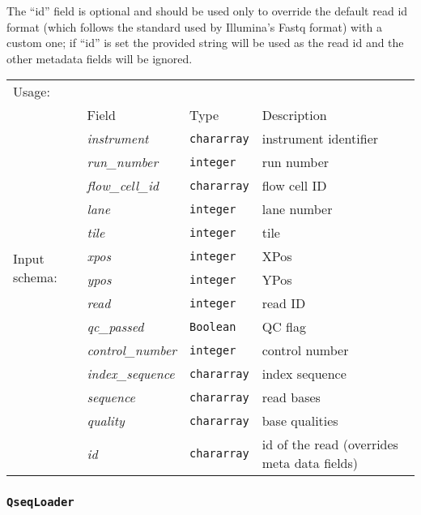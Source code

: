 The ``id'' field is optional and should be used only to override the default
read id format (which follows the standard used by Illumina's Fastq format) with
a custom one; if ``id'' is set the provided string will be used as the read id
and the other metadata fields will be ignored.

\begin{tabular}{lp{}p{}p{}}
Usage: & \multicolumn{3}{l}{}
\hspace*{-0.55cm}\begin{minipage}{0.8\textwidth}
  \begin{lstlisting}
  store reads into 'output.fastq' using FastqStorer();
  \end{lstlisting}
  \end{minipage}\hfill\kern-\arrayrulewidth
 \\[0.25cm]
\multirow{14}{*}{Input schema:} & Field & Type & Description\\[0.1cm]
& \emph{instrument} & \texttt{chararray} & instrument identifier\\
& \emph{run\_number} & \texttt{integer} & run number\\
& \emph{flow\_cell\_id} & \texttt{chararray} & flow cell ID\\
& \emph{lane} & \texttt{integer} & lane number\\
& \emph{tile} & \texttt{integer} & tile\\
& \emph{xpos} & \texttt{integer} & XPos\\
& \emph{ypos} & \texttt{integer} & YPos\\
& \emph{read} & \texttt{integer} & read ID\\
& \emph{qc\_passed} & \texttt{Boolean} & QC flag\\
& \emph{control\_number} & \texttt{integer} & control number\\
& \emph{index\_sequence} & \texttt{chararray} & index sequence\\
& \emph{sequence} & \texttt{chararray} & read bases\\
& \emph{quality} & \texttt{chararray} & base qualities\\
& \emph{id} & \texttt{chararray} & id of the read (overrides meta data fields)
\end{tabular}

\subsubsection{\texttt{QseqLoader}}


